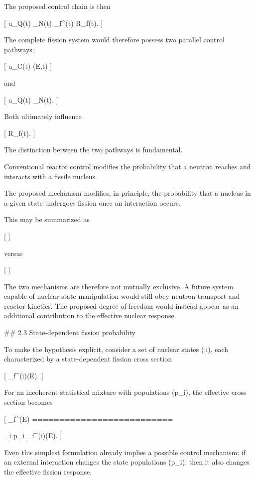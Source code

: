 The proposed control chain is then

[
u_Q(t)
\longrightarrow
\rho_N(t)
\longrightarrow
\sigma_f^{}(t)
\longrightarrow
R_f(t).
]

The complete fission system would therefore possess two parallel control pathways:

[
u_C(t)
\longrightarrow
\Phi(E,t)
]

and

[
u_Q(t)
\longrightarrow
\rho_N(t).
]

Both ultimately influence

[
R_f(t).
]

The distinction between the two pathways is fundamental.

Conventional reactor control modifies the probability that a neutron reaches and interacts with a fissile nucleus.

The proposed mechanism modifies, in principle, the probability that a nucleus in a given state undergoes fission once an interaction occurs.

This may be summarized as

[
]

versus

[
]

The two mechanisms are therefore not mutually exclusive. A future system capable of nuclear-state manipulation would still obey neutron transport and reactor kinetics. The proposed degree of freedom would instead appear as an additional contribution to the effective nuclear response.

## 2.3 State-dependent fission probability

To make the hypothesis explicit, consider a set of nuclear states ({|i\rangle}), each characterized by a state-dependent fission cross section

[
\sigma_f^{(i)}(E).
]

For an incoherent statistical mixture with populations (p_i), the effective cross section becomes

[
\sigma_f^{}(E)
==========================

\sum_i
p_i
\sigma_f^{(i)}(E).
]

Even this simplest formulation already implies a possible control mechanism: if an external interaction changes the state populations (p_i), then it also changes the effective fission response.

